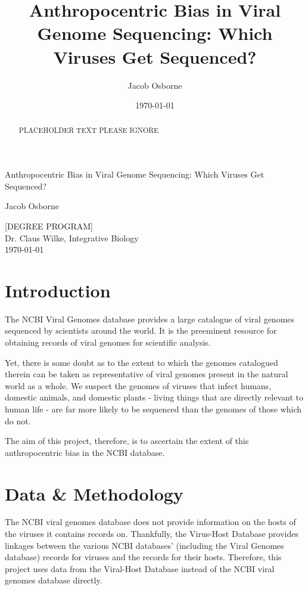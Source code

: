 \documentclass[12pt]{article}
\title{Anthropocentric Bias in Viral Genome Sequencing: Which Viruses Get Sequenced?}
\date{\today}
\author{Jacob Osborne}
\begin{document}
    \begin{titlepage}
        \begin{center}
            \vspace*{1in}
            \LARGE
            Anthropocentric Bias in Viral Genome Sequencing: Which Viruses Get Sequenced?

            \vspace*{1in}
            \large
            Jacob Osborne

            \vfill
            [DEGREE PROGRAM] \\
            Dr. Claus Wilke, Integrative Biology \\
            \today
        \end{center}
    \end{titlepage}
    
    \begin{abstract}
        PLACEHOLDER TEXT PLEASE IGNORE
    \end{abstract}

    \section{Introduction}

    The NCBI Viral Genomes database provides a large catalogue of viral genomes 
    sequenced by scientists around the world. It is the preeminent resource for
    obtaining records of viral genomes for scientific analysis.

    Yet, there is some doubt as to the extent to which the genomes catalogued
    therein can be taken as representative of viral genomes present in the
    natural world as a whole. We suspect the genomes of viruses that infect
    humans, domestic animals, and domestic plants - living things that are
    directly relevant to human life - are far more likely to be sequenced than
    the genomes of those which do not.

    The aim of this project, therefore, is to ascertain the extent of this
    anthropocentric bias in the NCBI database.

    \section{Data \& Methodology}

    The NCBI viral genomes database does not provide information on the hosts
    of the viruses it contains records on. Thankfully, the Virus-Host Database provides
    linkages between the various NCBI databases' (including the Viral Genomes
    database) records for viruses and the records for their hosts. Therefore,
    this project uses data from the Viral-Host Database instead of the NCBI viral
    genomes database directly.
\end{document}
